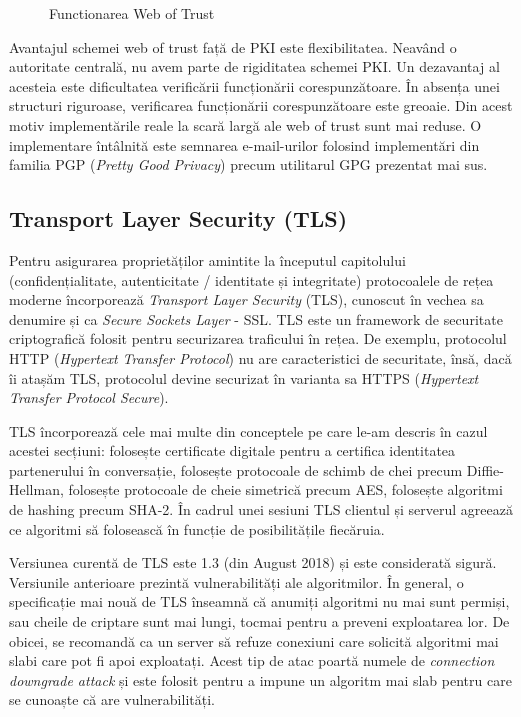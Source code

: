 \begin{figure}[htbp]
  \centering
  \def\svgwidth{\columnwidth}
  
  \caption{Functionarea Web of Trust}
  \label{fig:sec:web-of-trust}
\end{figure}

Avantajul schemei web of trust față de PKI este flexibilitatea. Neavând o autoritate centrală, nu avem parte de rigiditatea schemei PKI. Un dezavantaj al acesteia este dificultatea verificării funcționării corespunzătoare. În absența unei structuri riguroase, verificarea funcționării corespunzătoare este greoaie. Din acest motiv implementările reale la scară largă ale web of trust sunt mai reduse. O implementare întâlnită este semnarea e-mail-urilor folosind implementări din familia PGP  (\textit{Pretty Good Privacy}) precum utilitarul GPG prezentat mai sus.

\subsection{Transport Layer Security (TLS)}
\label{sec:sec:transfer:tls}

Pentru asigurarea proprietăților amintite la începutul capitolului (confidențialitate, autenticitate / identitate și integritate) protocoalele de rețea moderne încorporează \textit{Transport Layer Security} (TLS), cunoscut în vechea sa denumire și ca \textit{Secure Sockets Layer} - SSL. TLS este un framework de securitate criptografică folosit pentru securizarea traficului în rețea. De exemplu, protocolul HTTP (\textit{Hypertext Transfer Protocol}) nu are caracteristici de securitate, însă, dacă îi atașăm TLS, protocolul devine securizat în varianta sa HTTPS  (\textit{Hypertext Transfer Protocol Secure}).

TLS încorporează cele mai multe din conceptele pe care le-am descris în cazul acestei secțiuni: folosește certificate digitale pentru a certifica identitatea partenerului în conversație, folosește protocoale de schimb de chei precum Diffie-Hellman, folosește protocoale de cheie simetrică precum AES, folosește algoritmi de hashing precum SHA-2. În cadrul unei sesiuni TLS clientul și serverul agreează ce algoritmi să folosească în funcție de posibilitățile fiecăruia.

Versiunea curentă de TLS este 1.3 (din August 2018) și este considerată sigură. Versiunile anterioare prezintă vulnerabilități ale algoritmilor. În general, o specificație mai nouă de TLS înseamnă că anumiți algoritmi nu mai sunt permiși, sau cheile de criptare sunt mai lungi, tocmai pentru a preveni exploatarea lor. De obicei, se recomandă ca un server să refuze conexiuni care solicită algoritmi mai slabi care pot fi apoi exploatați. Acest tip de atac poartă numele de \textit{connection downgrade attack} și este folosit pentru a impune un algoritm mai slab pentru care se cunoaște că are vulnerabilități.

